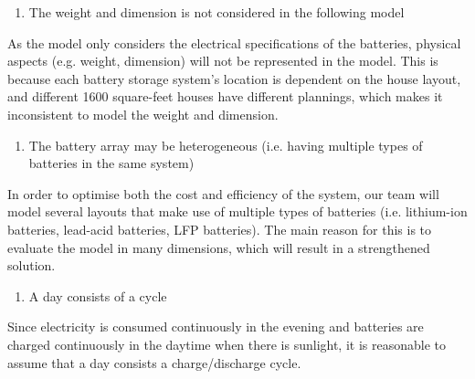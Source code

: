 \begin{enumerate}
    \item The weight and dimension is not considered in the following model
\end{enumerate}
As the model only considers the electrical specifications of the batteries, physical aspects (e.g. weight, dimension) will not be represented in the model. This is because each battery storage system's location is dependent on the house layout, and different 1600 square-feet houses have different plannings, which makes it inconsistent to model the weight and dimension.
\begin{enumerate}[resume]
    \item The battery array may be heterogeneous (i.e. having multiple types of batteries in the same system)
\end{enumerate}
In order to optimise both the cost and efficiency of the system, our team will model several layouts that make use of multiple types of batteries (i.e. lithium-ion batteries, lead-acid batteries, LFP batteries). The main reason for this is to evaluate the model in many dimensions, which will result in a strengthened solution.
\begin{enumerate}[resume]
    \item A day consists of a cycle
\end{enumerate}
Since electricity is consumed continuously in the evening and batteries are charged continuously in the daytime when there is sunlight, it is reasonable to assume that a day consists a charge/discharge cycle.